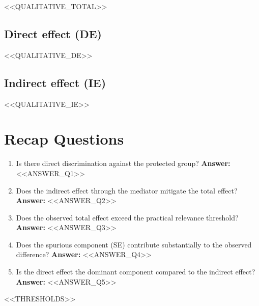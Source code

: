 \documentclass[11pt]{article}
\begin{document}
<<QUALITATIVE_TOTAL>>

\subsection{Direct effect (DE)}

<<QUALITATIVE_DE>>

\subsection{Indirect effect (IE)}

<<QUALITATIVE_IE>>

\section{Recap Questions}

\begin{enumerate}
\item Is there direct discrimination against the protected group? \textbf{Answer:} <<ANSWER_Q1>>
\item Does the indirect effect through the mediator mitigate the total effect? \textbf{Answer:} <<ANSWER_Q2>>
\item Does the observed total effect exceed the practical relevance threshold? \textbf{Answer:} <<ANSWER_Q3>>
\item Does the spurious component (SE) contribute substantially to the observed difference? \textbf{Answer:} <<ANSWER_Q4>>
\item Is the direct effect the dominant component compared to the indirect effect? \textbf{Answer:} <<ANSWER_Q5>>
\end{enumerate}

\vspace{1em}
\noindent\footnotesize
<<THRESHOLDS>>
\end{document}
